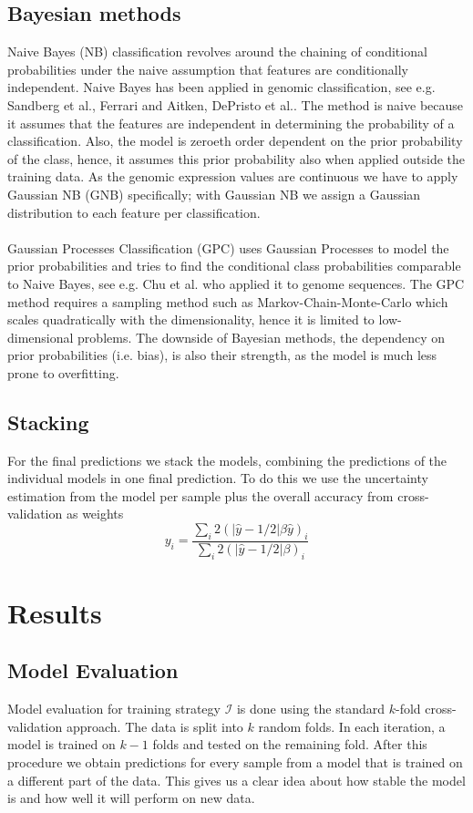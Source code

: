 \documentclass[a4paper,10pt]{article}
\begin{document}
\subsection{Bayesian methods}
%
Naive Bayes (NB) classification revolves around the chaining of conditional probabilities under the naive assumption
that features are conditionally independent. Naive Bayes has been applied in genomic classification, see e.g. Sandberg et al.\cite{Sandberg2001}, Ferrari and Aitken\cite{Ferrari2006}, DePristo et al.\cite{DePristo2011}. The method is naive because it assumes that the features are independent in determining the probability of a classification. Also, the model is 
zeroeth order dependent on the prior probability of the class, hence, it assumes this prior probability also when applied
outside the training data. As the genomic expression values are continuous we have to apply Gaussian NB (GNB) specifically; 
with Gaussian NB we assign a Gaussian distribution to each feature per classification. \\ \\
%
Gaussian Processes Classification (GPC) uses Gaussian Processes to model the prior probabilities and tries to find
the conditional class probabilities comparable to Naive Bayes, see e.g. Chu et al.\cite{Chu2005} who applied it to genome sequences. 
The GPC method requires a sampling method such as Markov-Chain-Monte-Carlo which scales quadratically with the dimensionality, hence it is limited to low-dimensional problems. The downside of Bayesian methods, the dependency on prior probabilities (i.e. bias), is also their strength, as the model is much less prone to overfitting. 
%
\subsection{Stacking}
%
For the final predictions we stack the models, combining the predictions of the individual 
models in one final prediction. To do this we use the uncertainty estimation from the model per sample plus the overall accuracy from cross-validation
as weights
\begin{equation*}
 y_i =  \frac{\sum_i 2(\vert \hat{y} - 1/2\vert\beta \hat{y})_i}{\sum_i{2(\vert \hat{y} - 1/2\vert\beta)_i}} 
\end{equation*}
%
\section{Results}
% 
\subsection{Model Evaluation}
%
Model evaluation for training strategy $\mathcal{I}$ is done using the standard $k$-fold cross-validation approach. The data is split into $k$ random folds. In each iteration, a model is trained on $k-1$ folds and tested on the remaining fold. After this procedure we obtain predictions for every sample from a model that is trained on a different part of the data. This gives us a clear idea about how stable the model is and how well it will perform on new data.
%
\end{document}
